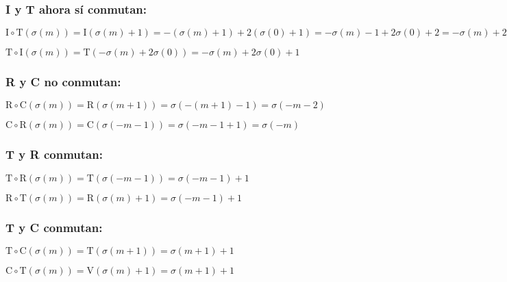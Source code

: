 		\subsubsection*{I y T ahora sí conmutan:}
		
		$\text{I}\circ\text{T}(\sigma(m))=\text{I}(\sigma(m)+1)=-(\sigma(m)+1) + 2(\sigma(0)+1)=-\sigma(m)-1+2\sigma(0)+2=-\sigma(m)+2\sigma(0)+1$
		
		$\text{T}\circ\text{I}(\sigma(m))=\text{T}(-\sigma(m)+2\sigma(0))=-\sigma(m)+2\sigma(0)+1$\\
		
		\subsubsection*{R y C no conmutan:}
		
		$\text{R}\circ\text{C}(\sigma(m))=\text{R}(\sigma(m+1))=\sigma(-(m+1)-1)=\sigma(-m-2)$
		
		$\text{C}\circ\text{R}(\sigma(m))=\text{C}(\sigma(-m-1))=\sigma(-m-1+1)=\sigma(-m)$\\
		
		\subsubsection*{T y R conmutan:}
		
		$\text{T}\circ\text{R}(\sigma(m))=\text{T}(\sigma(-m-1))=\sigma(-m-1)+1$
		
		$\text{R}\circ\text{T}(\sigma(m))=\text{R}(\sigma(m)+1)=\sigma(-m-1)+1$\\
		
		\subsubsection*{T y C conmutan:}
		
		$\text{T}\circ\text{C}(\sigma(m))=\text{T}(\sigma(m+1))=\sigma(m+1)+1$
		
		$\text{C}\circ\text{T}(\sigma(m))=\text{V}(\sigma(m)+1)=\sigma(m+1)+1$